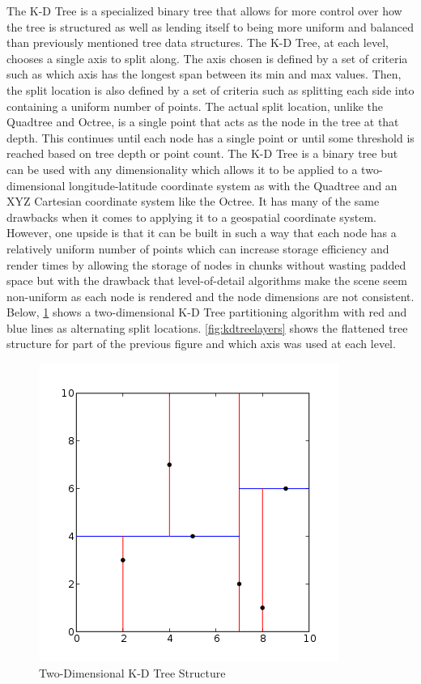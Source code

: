 The K-D Tree is a specialized binary tree that allows for more control over how
the tree is structured as well as lending itself to being more uniform and
balanced than previously mentioned tree data structures. The K-D Tree, at each
level, chooses a single axis to split along. The axis chosen is defined by a set
of criteria such as which axis has the longest span between its min and max
values. Then, the split location is also defined by a set of criteria such as
splitting each side into containing a uniform number of points. The actual split
location, unlike the Quadtree and Octree, is a single point that acts as the
node in the tree at that depth. This continues until each node has a single
point or until some threshold is reached based on tree depth or point count. The
K-D Tree is a binary tree but can be used with any dimensionality which allows
it to be applied to a two-dimensional longitude-latitude coordinate system as
with the Quadtree and an XYZ Cartesian coordinate system like the Octree. It has
many of the same drawbacks when it comes to applying it to a geospatial
coordinate system. However, one upside is that it can be built in such a way
that each node has a relatively uniform number of points which can increase
storage efficiency and render times by allowing the storage of nodes in chunks
without wasting padded space but with the drawback that level-of-detail
algorithms make the scene seem non-uniform as each node is rendered and the node
dimensions are not consistent. Below, \ref{fig:kdtree2d} shows a two-dimensional K-D Tree
partitioning algorithm with red and blue lines as alternating split locations.
\ref{fig:kdtreelayers} shows the flattened tree structure for part of the previous figure and
which axis was used at each level.

\begin{figure}[htb]
\begin{center}
\includegraphics[width=.5\linewidth]{images/kdtree_2d.png}
\end{center}
\caption{Two-Dimensional K-D Tree Structure \cite{12_kdtree_2d.svg}}
\label{fig:kdtree2d}
\end{figure}

